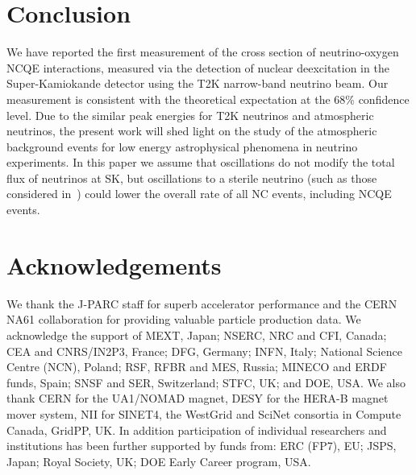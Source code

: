 \documentclass[
aps,
prd,
twocolumn,
superscriptaddress,
showpacs
]{revtex4-1}
\begin{document}
\section{Conclusion}
We have reported the first measurement of the cross section of neutrino-oxygen NCQE interactions, measured via the detection of nuclear deexcitation \gmrs in the Super-Kamiokande detector using the T2K narrow-band neutrino beam.  Our measurement is consistent with the theoretical expectation at the 68\% confidence level. Due to the similar peak energies for T2K neutrinos and atmospheric neutrinos, the present work will shed light on the study of the atmospheric background events for low energy astrophysical  phenomena in neutrino experiments. In this paper we assume that oscillations do not modify the total flux of neutrinos at SK, but oscillations to a sterile neutrino (such as those considered in~\cite{Adamson:2011ku}) could lower the overall rate of all NC events, including NCQE events.


\section{Acknowledgements}
We thank the J-PARC staff for superb accelerator performance and the
CERN NA61 collaboration for providing valuable particle production data.
We acknowledge the support of MEXT, Japan;
NSERC, NRC and CFI, Canada;
CEA and CNRS/IN2P3, France;
DFG, Germany;
INFN, Italy;
National Science Centre (NCN), Poland;
RSF, RFBR and MES, Russia;
MINECO and ERDF funds, Spain;
SNSF and SER, Switzerland;
STFC, UK; and
DOE, USA.
We also thank CERN for the UA1/NOMAD magnet,
DESY for the HERA-B magnet mover system,
NII for SINET4,
the WestGrid and SciNet consortia in Compute Canada,
GridPP, UK.
In addition participation of individual researchers
and institutions has been further supported by funds from: ERC (FP7), EU;
JSPS, Japan;
Royal Society, UK;
DOE Early Career program, USA.





\end{document}
